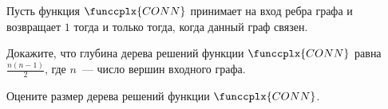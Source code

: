 Пусть функция $\funccplx{CONN}$ принимает на вход ребра графа и возвращает $1$ тогда и только тогда,
когда данный граф связен. 
\begin{enumcyr}
    \item Докажите, что глубина дерева решений функции $\funccplx{CONN}$ равна $\frac{n (n - 1)}{2}$, где
        $n$~--- число вершин входного графа.
    \item Оцените размер дерева решений функции $\funccplx{CONN}$.
\end{enumcyr}